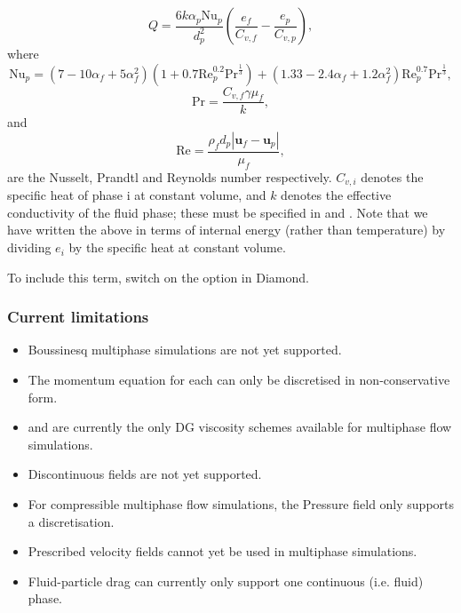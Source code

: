 \begin{equation}\label{eq:gunn_heat_transfer_term}
Q = \frac{6 k \alpha_p \mathrm{Nu}_p}{d_p^2}\left(\frac{e_f}{C_{v,f}} - \frac{e_p}{C_{v,p}}\right),
\end{equation}
where 
\begin{equation}
\mathrm{Nu}_p = \left(7 - 10\alpha_f + 5\alpha_f^2\right)\left(1 + 0.7\mathrm{Re}_p^{0.2}\mathrm{Pr}^{\frac{1}{3}}\right) + \left(1.33 - 2.4\alpha_f + 1.2\alpha_f^2\right)\mathrm{Re}_p^{0.7}\mathrm{Pr}^{\frac{1}{3}},
\end{equation}
\begin{equation}
 \mathrm{Pr} = \frac{C_{v,f} \gamma \mu_f}{k},
\end{equation}
and
\begin{equation}
 \mathrm{Re} = \frac{\rho_f d_p |\mathbf{u}_f-\mathbf{u}_p|}{\mu_f},
\end{equation}
are the Nusselt, Prandtl and Reynolds number respectively. $C_{v,i}$ denotes the specific heat of phase i at constant volume, and $k$ denotes the effective conductivity of the fluid phase; these must be specified in  and . Note that we have written the above in terms of internal energy (rather than temperature) by dividing $e_i$ by the specific heat at constant volume.

To include this term, switch on the  option in Diamond.

\subsubsection{Current limitations}
\begin{itemize}
 \item Boussinesq multiphase simulations are not yet supported.
 \item The momentum equation for each  can only be discretised in non-conservative form.
 \item {} and  are currently the only DG viscosity schemes available for multiphase flow simulations.
 \item Discontinuous  fields are not yet supported.
 \item For compressible multiphase flow simulations, the Pressure field only supports a  discretisation.
 \item Prescribed velocity fields cannot yet be used in multiphase simulations.
 \item Fluid-particle drag can currently only support one continuous (i.e. fluid) phase.
\end{itemize}


